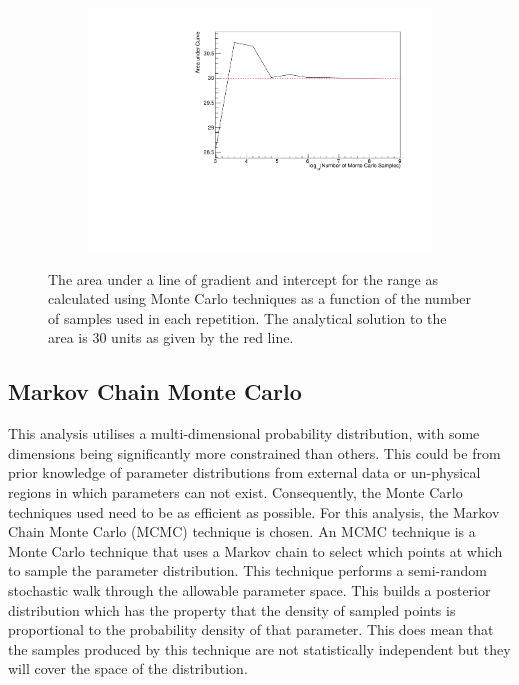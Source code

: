 \begin{figure}[h]
  \begin{subfigure}[t]{0.80\textwidth}
    \includegraphics[width=\textwidth, trim={0mm 0mm 0mm 0mm}, clip,page=1]{Figures/MCMC/MCTechnique_NThrowsStudy.pdf}
  \end{subfigure}
  \caption{The area under a line of gradient  and intercept  for the range  as calculated using Monte Carlo techniques as a function of the number of samples used in each repetition. The analytical solution to the area is 30 units as given by the red line.}
  \label{fig:MCMC_MCTechniqueNThrowsStudy}
\end{figure}

\subsection{Markov Chain Monte Carlo}
\label{sec:MarkovChainMonteCarlo_MarkovChainMC}
This analysis utilises a multi-dimensional probability distribution, with some dimensions being significantly more constrained than others. This could be from prior knowledge of parameter distributions from external data or un-physical regions in which parameters can not exist. Consequently, the Monte Carlo techniques used need to be as efficient as possible. For this analysis, the Markov Chain Monte Carlo (MCMC) technique is chosen. An MCMC technique is a Monte Carlo technique that uses a Markov chain to select which points at which to sample the parameter distribution. This technique performs a semi-random stochastic walk through the allowable parameter space. This builds a posterior distribution which has the property that the density of sampled points is proportional to the probability density of that parameter. This does mean that the samples produced by this technique are not statistically independent but they will cover the space of the distribution.

